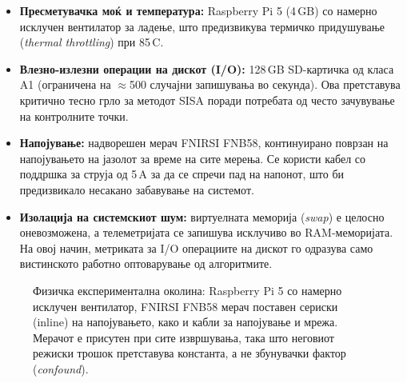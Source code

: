 \begin{itemize}
  \item \textbf{Пресметувачка моќ и температура:} Raspberry Pi 5 (4\,GB) со намерно исклучен вентилатор за ладење, што предизвикува термичко придушување (\emph{thermal throttling}) при 85\,\textdegree C.
  \item \textbf{Влезно-излезни операции на дискот (I/O):} 128\,GB SD-картичка од класа A1 (ограничена на $\approx$500 случајни запишувања во секунда). Ова претставува критично тесно грло за методот SISA поради потребата од често зачувување на контролните точки.
  \item \textbf{Напојување:} надворешен мерач FNIRSI FNB58, континуирано поврзан на напојувањето на јазолот за време на сите мерења. Се користи кабел со поддршка за струја од 5\,A за да се спречи пад на напонот, што би предизвикало несакано забавување на системот.
  \item \textbf{Изолација на системскиот шум:} виртуелната меморија (\emph{swap}) е целосно оневозможена, а телеметријата се запишува исклучиво во RAM-меморијата. На овој начин, метриката за I/O операциите на дискот го одразува само вистинското работно оптоварување од алгоритмите.
\end{itemize}

\begin{figure}[htbp]
  \centering
  \caption{Физичка експериментална околина: Raspberry Pi 5 со намерно исклучен вентилатор,
  FNIRSI FNB58 мерач поставен сериски (inline) на напојувањето, како и кабли за
  напојување и мрежа. Мерачот е присутен при сите извршувања, така што неговиот
  режиски трошок претставува константа, а не збунувачки фактор (\emph{confound}).}
  \label{fig:testbed}
\end{figure}

